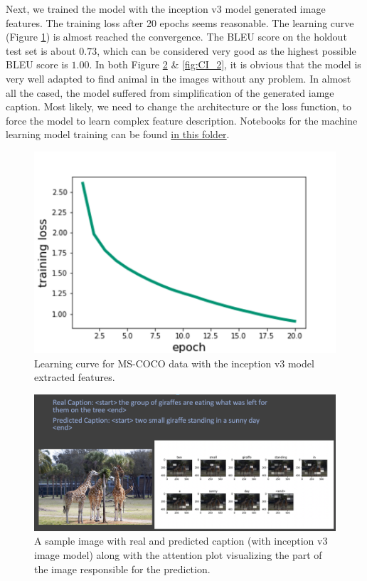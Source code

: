 \documentclass[12pt]{article}
\begin{document}
Next, we trained the model with the inception v3 model generated image features. The training loss after 20 epochs seems reasonable. The learning curve (Figure \ref{fig:CILR}) is almost reached the convergence. The BLEU score on the holdout test set is about $0.73$, which can be considered very good as the highest possible BLEU score is $1.00$. In both Figure \ref{fig:CI_1} \& \ref{fig:CI_2}, it is obvious that the model is very well adapted to find animal in the images without any problem. In almost all the cased, the model suffered from simplification of the generated iamge caption. Most likely, we need to change the architecture or the loss function, to force the model to learn complex feature description. Notebooks for the machine learning model training can be found \href{https://github.com/mamunm/iamge_caption_generator/tree/main/notebooks}{in this folder}.

\begin{figure}[h!]
\begin{center}
\includegraphics[width=7in]{CILR.png}
\end{center}
\caption{\label{fig:CILR}
Learning curve for MS-COCO data with the inception v3 model extracted features.}
\end{figure}

\begin{figure}[h!]
\begin{center}
\includegraphics[width=7in]{CI_1.png}
\end{center}
\caption{\label{fig:CI_1}
A sample image with real and predicted caption (with inception v3 image model) along with the attention plot visualizing the part of the image responsible for the prediction.}
\end{figure}
\end{document}
